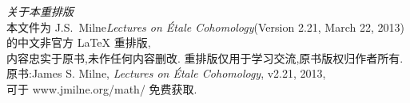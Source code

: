 \begin{titlepage}
\vfill

\cleardoublepage
\end{titlepage}

\thispagestyle{empty}
\begin{center}
    \small
    \noindent\emph{关于本重排版}\\[0.5em]
    本文件为 J.S.\ Milne\emph{Lectures on \'Etale Cohomology}(Version 2.21, March 22, 2013)
    的中文非官方 \LaTeX{} 重排版,\\
    内容忠实于原书,未作任何内容删改.
    重排版仅用于学习交流,原书版权归作者所有.\\
    \vspace{0.5cm}
    原书:James S. Milne, \textit{Lectures on \'Etale Cohomology}, v2.21, 2013,\\
    可于 www.jmilne.org/math/ 免费获取.
\end{center}
